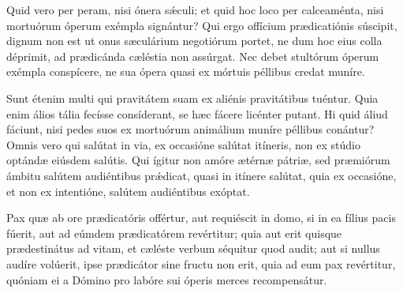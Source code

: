 {\noindent Quid vero per peram, nisi ónera sǽculi; et quid hoc loco per calceaménta, nisi mortuórum óperum exémpla signántur? Qui ergo offícium prædicatiónis súscipit, dignum non est ut onus sæculárium negotiórum portet, ne dum hoc eius colla déprimit, ad prædicánda cæléstia non assúrgat. Nec debet stultórum óperum exémpla conspícere, ne sua ópera quasi ex mórtuis péllibus credat muníre.

\noindent Sunt étenim multi qui pravitátem suam ex aliénis pravitátibus tuéntur. Quia enim álios tália fecísse consíderant, se hæc fácere licénter putant. Hi quid áliud fáciunt, nisi pedes suos ex mortuórum animálium muníre péllibus conántur? Omnis vero qui salútat in via, ex occasióne salútat itíneris, non ex stúdio optándæ eiúsdem salútis. Qui ígitur non amóre ætérnæ pátriæ, sed præmiórum ámbitu salútem audiéntibus prǽdicat, quasi in itínere salútat, quia ex occasióne, et non ex intentióne, salútem audiéntibus exóptat.

\noindent Pax quæ ab ore prædicatóris offértur, aut requiéscit in domo, si in ea fílius pacis fúerit, aut ad eúmdem prædicatórem revértitur; quia aut erit quisque prædestinátus ad vitam, et cæléste verbum séquitur quod audit; aut si nullus audíre volúerit, ipse prædicátor sine fructu non erit, quia ad eum pax revértitur, quóniam ei a Dómino pro labóre sui óperis merces recompensátur.

\vfill
\pagebreak

 

\vspace{-5mm}


\vfill
\pagebreak
}
\newcommand{\benedictus}{\pars{Canticum Zachariæ.} \scriptura{Mt. 9, 37}

\vspace{-4mm}

\antiphona{II D}{temporalia/ant-mittensdominus.gtex}

\vspace{-2mm}

\scriptura{Lc. 1, 68-79}


\cantusSineNeumas
\initiumpsalmi{temporalia/benedictus-initium-iisoll-D-auto.gtex}


 \Abardot{}}


